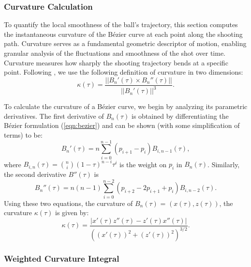 \documentclass{article}
\begin{document}
        \subsubsection{Curvature Calculation}

          To quantify the local smoothness of the ball’s trajectory, this section computes the instantaneous curvature of the Bézier curve at each point along the shooting path. Curvature serves as a fundamental geometric descriptor of motion, enabling granular analysis of the fluctuations and smoothness of the shot over time. Curvature measures how sharply the shooting trajectory bends at a specific point. Following \citet{slegers_role_2024}, we use the following definition of curvature in two dimensions:
          \[
            \kappa(\tau) = \frac{||B_n'(\tau) \times B_n''(\tau)||}{||B_n'(\tau)||^3}.
          \]
          
          To calculate the curvature of a Bézier curve, we begin by analyzing its parametric derivatives. The first derivative of \(B_n(\tau)\) is obtained by differentiating the Bézier formulation (\ref{eqn:bezier}) and can be shown (with some simplification of terms) to be:
          \[ 
            B_n'(\tau) = n \sum_{i=0}^{n-1} (p_{i+1} - p_i) B_{i,n-1}(\tau),
          \]
          where \(B_{i, n}(\tau) = \binom{n}{i}(1 - \tau)^{n-i}\tau^i\) is the weight on $p_i$ in $B_n(\tau)$. Similarly, the second derivative \( B''(\tau) \) is
          \[
            B_n''(\tau) = n(n-1) \sum_{i=0}^{n-2} (p_{i+2} - 2p_{i+1} + p_i) B_{i,n-2}(\tau).
          \]
          Using these two equations, the curvature of \(B_n(\tau)\) = \((x(\tau), z(\tau))\), the curvature \( \kappa(\tau) \) is given by:
          \[
            \kappa(\tau) = \frac{\left| x'(\tau) z''(\tau) - z'(\tau) x''(\tau) \right|}{\left( (x'(\tau))^2 + (z'(\tau))^2 \right)^{3/2}}.
          \]
    
        \subsubsection{Weighted Curvature Integral}
        \label{sec:weighted-curvature-integral}
    
        
\end{document}
